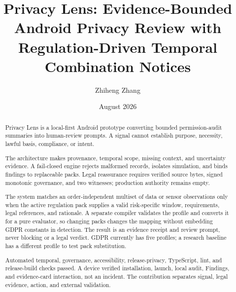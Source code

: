 \documentclass[11pt,a4paper]{article}
\title{Privacy Lens: Evidence-Bounded Android Privacy Review with Regulation-Driven Temporal Combination Notices}
\author{Zhiheng Zhang}
\date{August 2026}
\begin{document}
\maketitle
\begin{abstract}
\small\singlespacing
Privacy Lens is a local-first Android prototype converting bounded permission-audit summaries into human-review prompts. A signal cannot establish purpose, necessity, lawful basis, compliance, or intent.

The architecture makes provenance, temporal scope, missing context, and uncertainty evidence. A fail-closed engine rejects malformed records, isolates simulation, and binds findings to replaceable packs. Legal reassurance requires verified source bytes, signed monotonic governance, and two witnesses; production authority remains empty.

The system matches an order-independent multiset of data or sensor observations only when the active regulation pack supplies a valid risk-specific window, requirements, legal references, and rationale. A separate compiler validates the profile and converts it for a pure evaluator, so changing packs changes the mapping without embedding GDPR constants in detection. The result is an evidence receipt and review prompt, never blocking or a legal verdict. GDPR currently has five profiles; a research baseline has a different profile to test pack substitution.

Automated temporal, governance, accessibility, release-privacy, TypeScript, lint, and release-build checks passed. A device verified installation, launch, local audit, Findings, and evidence-card interaction, not an incident. The contribution separates signal, legal evidence, action, and external validation.
\end{abstract}
\newpage
\tableofcontents
\newpage







{\small


}
\end{document}
